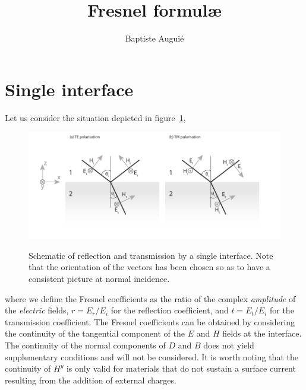 \documentclass[a4paper,11pt]{article}
\author{Baptiste Augui\'e}
\title{Fresnel formul\ae}
\begin{document}
\maketitle

\section{Single interface}

Let us consider the situation depicted in figure~\ref{fig:interface}, 
% 
\begin{figure}[!ht]
\centering\includegraphics{interface}
\label{fig:interface}
\caption[Schematic of reflection and transmission by a single interface.]{Schematic of reflection and transmission by a single interface. Note that the orientation of the vectors has been chosen so as to have a  consistent picture at normal incidence.}
\end{figure}
% 
where we define the Fresnel coefficients as the ratio of the complex \emph{amplitude} of the \emph{electric} fields, $r= E_r/E_i$ for the reflection coefficient, and $t= E_t/E_i$ for the transmission coefficient. The Fresnel coefficients can be obtained by considering the continuity of the tangential component of the $E$ and $H$ fields at the interface. The continuity of the normal components of $D$ and $B$ does not yield supplementary conditions and will not be considered. It is worth noting that the continuity of $H^y$ is only valid for materials that do not sustain a surface current resulting from the addition of external charges. 
\end{document}
